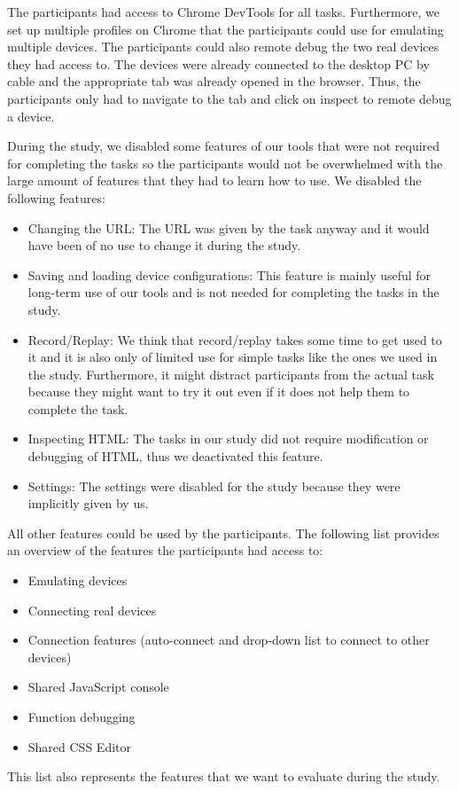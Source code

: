 The participants had access to Chrome DevTools for all tasks. Furthermore, we set up multiple profiles on Chrome that the participants could use for emulating multiple devices. The participants could also remote debug the two real devices they had access to. The devices were already connected to the desktop PC by cable and the appropriate tab was already opened in the browser. Thus, the participants only had to navigate to the tab and click on inspect to remote debug a device. 

During the study, we disabled some features of our tools that were not required for completing the tasks so the participants would not be overwhelmed with the large amount of features that they had to learn how to use. We disabled the following features:
\begin{itemize}
	\item Changing the URL: The URL was given by the task anyway and it would have been of no use to change it during the study.
	\item Saving and loading device configurations: This feature is mainly useful for long-term use of our tools and is not needed for completing the tasks in the study.
	\item Record/Replay: We think that record/replay takes some time to get used to it and it is also only of limited use for simple tasks like the ones we used in the study. Furthermore, it might distract participants from the actual task because they might want to try it out even if it does not help them to complete the task.
	\item Inspecting HTML: The tasks in our study did not require modification or debugging of HTML, thus we deactivated this feature.
	\item Settings: The settings were disabled for the study because they were implicitly given by us.
\end{itemize}

All other features could be used by the participants. The following list provides an overview of the features the participants had access to:
\begin{itemize}
	\item Emulating devices
	\item Connecting real devices
	\item Connection features (auto-connect and drop-down list to connect to other devices)
	\item Shared JavaScript console
	\item Function debugging
	\item Shared CSS Editor
\end{itemize}
This list also represents the features that we want to evaluate during the study.

